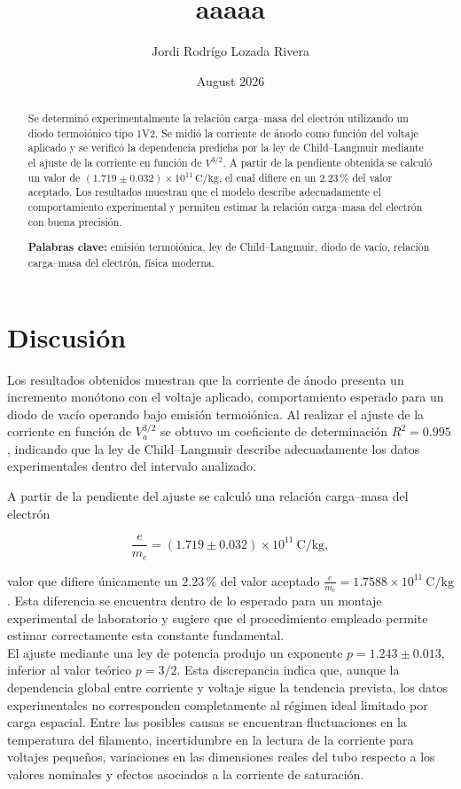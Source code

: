\documentclass{article}
\title{aaaaa}
\author{Jordi Rodrígo Lozada Rivera}
\date{August 2026}
\begin{document}
\begin{abstract}
Se determinó experimentalmente la relación carga--masa del electrón utilizando un
diodo termoiónico tipo 1V2. Se midió la corriente de ánodo como función del voltaje
aplicado y se verificó la dependencia predicha por la ley de Child--Langmuir mediante
el ajuste de la corriente en función de $V^{3/2}$. A partir de la pendiente obtenida
se calculó un valor de
$\left(1.719\pm0.032\right)\times10^{11}\,\mathrm{C/kg}$,
el cual difiere en un $2.23\,\%$ del valor aceptado. Los resultados muestran que el
modelo describe adecuadamente el comportamiento experimental y permiten estimar la
relación carga--masa del electrón con buena precisión.

\textbf{Palabras clave:} emisión termoiónica, ley de Child--Langmuir, diodo de vacío,
relación carga--masa del electrón, física moderna.
\end{abstract}

\section{Discusión}

Los resultados obtenidos muestran que la corriente de ánodo presenta un incremento
monótono con el voltaje aplicado, comportamiento esperado para un diodo de vacío
operando bajo emisión termoiónica. Al realizar el ajuste de la corriente en función
de $V_a^{3/2}$ se obtuvo un coeficiente de determinación $R^2=0.995$, indicando que
la ley de Child--Langmuir describe adecuadamente los datos experimentales dentro del
intervalo analizado.

A partir de la pendiente del ajuste se calculó una relación carga--masa del electrón

\[
\frac{e}{m_e}=(1.719\pm0.032)\times10^{11}\ \mathrm{C/kg},
\]

valor que difiere únicamente un $2.23\,\%$ del valor aceptado
$\frac{e}{m_e}=1.7588\times10^{11}\ \mathrm{C/kg}$.
Esta diferencia se encuentra dentro de lo esperado para un montaje experimental de
laboratorio y sugiere que el procedimiento empleado permite estimar correctamente
esta constante fundamental.\\

El ajuste mediante una ley de potencia produjo un exponente
$p=1.243\pm0.013$, inferior al valor teórico $p=3/2$. Esta discrepancia indica que,
aunque la dependencia global entre corriente y voltaje sigue la tendencia prevista,
los datos experimentales no corresponden completamente al régimen ideal limitado por
carga espacial. Entre las posibles causas se encuentran fluctuaciones en la
temperatura del filamento, incertidumbre en la lectura de la corriente para voltajes
pequeños, variaciones en las dimensiones reales del tubo respecto a los valores
nominales y efectos asociados a la corriente de saturación.\\
\end{document}

